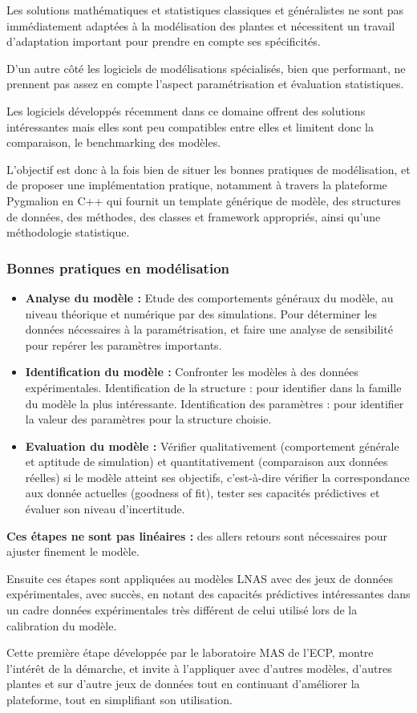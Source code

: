 Les solutions mathématiques et statistiques classiques et généralistes ne sont pas immédiatement adaptées à la modélisation des plantes et nécessitent un travail d’adaptation important pour prendre en compte ses spécificités.

D’un autre côté les logiciels de modélisations spécialisés, bien que performant, ne prennent pas assez en compte l’aspect paramétrisation et évaluation statistiques.

Les logiciels développés récemment dans ce domaine offrent des solutions intéressantes mais elles sont peu compatibles entre elles et limitent donc la comparaison, le benchmarking des modèles.

L’objectif est donc à la fois bien de situer les bonnes pratiques de modélisation, et de proposer une implémentation pratique, notamment à travers la plateforme Pygmalion en C++ qui fournit un template générique de modèle, des structures de données, des méthodes, des classes et framework appropriés, ainsi qu’une méthodologie statistique.

\subsubsection{Bonnes pratiques en modélisation}

\begin{itemize}

\item \textbf{Analyse du modèle :} Etude des comportements généraux du modèle, au niveau théorique et numérique par des simulations. Pour déterminer les données nécessaires à la paramétrisation, et faire une analyse de sensibilité pour repérer les paramètres importants.
\item \textbf{Identification du modèle :} Confronter les modèles à des données expérimentales. Identification de la structure : pour identifier dans la famille du modèle la plus intéressante. Identification des paramètres : pour identifier la valeur des paramètres pour la structure choisie.
\item \textbf{Evaluation du modèle :} Vérifier qualitativement (comportement générale et aptitude de simulation) et quantitativement (comparaison aux données réelles) si le modèle atteint ses objectifs, c’est-à-dire vérifier la correspondance aux donnée actuelles (goodness of fit), tester ses capacités prédictives et évaluer son niveau d’incertitude.

\end{itemize}

\textbf{Ces étapes ne sont pas linéaires :} des allers retours sont nécessaires pour ajuster finement le modèle.

Ensuite ces étapes sont appliquées au modèles LNAS avec des jeux de données expérimentales, avec succès, en notant des capacités prédictives intéressantes dans un cadre données expérimentales très différent de celui utilisé lors de la calibration du modèle.

Cette première étape développée par le laboratoire MAS de l’ECP, montre l’intérêt de la démarche, et invite à l’appliquer avec d’autres modèles, d’autres plantes et sur d’autre jeux de données tout en continuant d’améliorer la plateforme, tout en simplifiant son utilisation.
